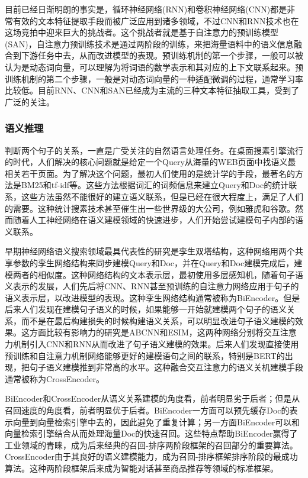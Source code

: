 \documentclass[twoside,a4paper,12pt]{book}%
\begin{document}
目前已经日渐明朗的事实是，循环神经网络(\gls{RNN})和卷积神经网络(\gls{CNN})都是非常有效的文本特征提取手段而被广泛应用到诸多领域，不过\gls{CNN}和\gls{RNN}技术也在这场竞拍中迎来巨大的挑战者。这个挑战者就是基于自注意力的预训练模型(\gls{SAN})，自注意力预训练技术是通过两阶段的训练，来把海量语料中的语义信息融合到下游任务中去，从而改进模型的表现。预训练机制的第一个步骤，一般可以被认为是动态词向量，可以理解为将词语的数学表示和其对应的上下文联系起来。预训练机制的第二个步骤，一般是对动态词向量的一种适配微调的过程，通常学习率比较低。目前\gls{RNN}、\gls{CNN}和\gls{SAN}已经成为主流的三种文本特征抽取工具，受到了广泛的关注。

\subsubsection{语义推理}
判断两个句子的关系，一直是广受关注的自然语言处理任务。在桌面搜素引擎流行的时代，人们解决的核心问题就是给定一个Query从海量的WEB页面中找语义最相关若干页面。为了解决这个问题，最初人们使用的是统计学的手段，最著名的方法是BM25和tf-idf等。这些方法根据词汇的词频信息来建立Query和Doc的统计联系，这些方法虽然不能很好的建立语义联系，但是已经在很大程度上，满足了人们的需要。这种统计搜素技术甚至催生出一些世界级的大公司，例如雅虎和谷歌。然而随着人工神经网络在语义建模领域的快速进步，人们开始尝试建模句子内部的语义联系。

早期神经网络语义搜索领域最具代表性的研究是孪生双塔结构，这种网络用两个共享参数的孪生网络结构来同步建模Query和Doc，并在Query和Doc建模完成后，建模两者的相似度。这种网络结构的文本表示层，最初使用多层感知机，随着句子语义表示的发展，人们先后将\gls{CNN}、\gls{RNN}甚至预训练的自注意力网络应用于句子的语义表示层，以改进模型的表现。这种孪生网络结构通常被称为BiEncoder。但是后来人们发现在建模句子语义的时候，如果能够一开始就建模两个句子的语义关系，而不是在最后构建损失的时候构建语义关系，可以明显改进句子语义建模的效果。这方面比较有影响力的研究是ABCNN和ESIM，这两种网络分别将交互注意力机制引入\gls{CNN}和\gls{RNN}从而改进了句子语义建模的效果。后来人们发现直接使用预训练和自注意力机制网络能够更好的建模语句之间的联系，特别是\gls{BERT}的出现，把句子语义建模推到非常高的水平。这种融合交互注意力的语义关机建模手段
通常被称为CrossEncoder。

BiEncoder和CrossEncoder从语义关系建模的角度看，前者明显劣于后者；但是从召回速度的角度看，前者明显优于后者。BiEncoder一方面可以预先缓存Doc的表示向量到向量检索引擎中去的，因此避免了重复计算；另一方面BiEncoder可以和向量检索引擎结合从而处理海量Doc的快速召回。这些特点帮助BiEncoder赢得了工业领域的青睐，成为后来经典的召回-排序两阶段框架的召回部分的重要算法。CrossEncoder由于其良好的语义建模能力，成为召回-排序框架排序阶段的最成功算法。这种两阶段框架后来成为智能对话甚至商品推荐等领域的标准框架。
\end{document}
